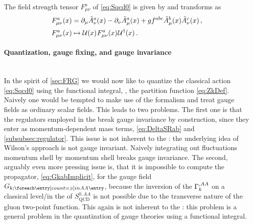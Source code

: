 The field strength tensor $F_{\mu\nu}^a$ of \cref{eq:Sqcd0} is given by and transforms as 
\begin{subequations}\label{eq:FmunuUgauge}
\begin{align}
	F_{\mu\nu}^a(x)& = \partial_\mu \tilde{A}_\nu^a(x)- \partial_\nu \tilde{A}_\mu^a(x) + g f^{abc} \tilde{A}_\mu^b(x) \tilde{A}_\nu^c(x)\, ,\\[0.1em]
	F_{\mu\nu}^a(x) &\mapsto \mathcal{U}{}(x)\mskip1.0mu{}F_{\mu\nu}^a(x)\mskip1.0mu{}\mathcal{U}{}^\dagger (x) \, .
\end{align}
\end{subequations} 

\paragraph{Quantization, gauge fixing, and gauge invariance}\label{paragraph:qcdGF}\mbox{}\\%
In the spirit of \cref{sec:FRG} we would now like to quantize the classical action \eqref{eq:Sqcd0} using the functional integral, \ie{}, the partition function \eqref{eq:ZkDef}.
Naively one would be tempted to make use of the \fs{} formalism and treat gauge fields as ordinary scalar fields.
This leads to two problems.
The first one is that the regulators employed in the \frg{} break gauge invariance by construction, since they enter as momentum-dependent mass terms, \cf{} \cref{eq:DeltaSRab} and \cref{subsubsec:regulator}.
This issue is not inherent to the \frg{}: the underlying idea of Wilson's \rg{} approach is not gauge invariant.
Naively integrating out fluctuations momentum shell by momentum shell breaks gauge invariance. 
The second, arguably even more pressing issue is, that it is impossible to compute the propagator, \cf{} \cref{eq:GkabImplicit}, for the gauge field $\FSpropagator{AA}$, because the inversion of the 
$\Gamma_k^{,AA}$ \dash{} on a classical level/in the \uv{} of $S_\mathrm{QCD}^{0,AA}$ \dash{} is not possible due to the transverse nature of the gluon two-point function.
This again is not inherent to the \frg{}: this problem is a general problem in the quantization of gauge theories using a functional integral.

